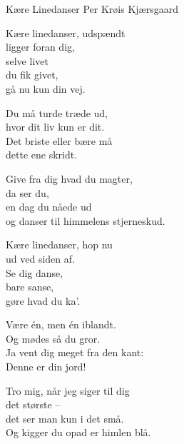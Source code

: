 \begin{song}{Kære Linedanser}
  {} %
  {\SBOrgMel} %
  {Per Krøis Kjærsgaard} %
  {} %
  {\NotCCLIed} %

  \begin{SBVerse}
    Kære linedanser, udspændt \\
    ligger foran dig, \\
    selve livet \\
    du fik givet, \\
    gå nu kun din vej. \\ \medskip

    Du må turde træde ud, \\
    hvor dit liv kun er dit. \\
    Det briste eller bære må \\
    dette ene skridt. \\ \medskip

    Give fra dig hvad du magter, \\
    da ser du, \\
    en dag du nåede ud \\
    og danser til himmelens stjerneskud. \\
  \end{SBVerse}

  \begin{SBVerse}
    Kære linedanser, hop nu \\
    ud ved siden af. \\
    Se dig danse, \\
    bare sanse, \\
    gøre hvad du ka'. \\ \medskip

    Være én, men én iblandt. \\
    Og mødes så du gror. \\
    Ja vent dig meget fra den kant: \\
    Denne er din jord! \\ \medskip

    Tro mig, når jeg siger til dig \\
    det største – \\
    det ser man kun i det små. \\
    Og kigger du opad er himlen blå. \\
  \end{SBVerse}


\end{song}
